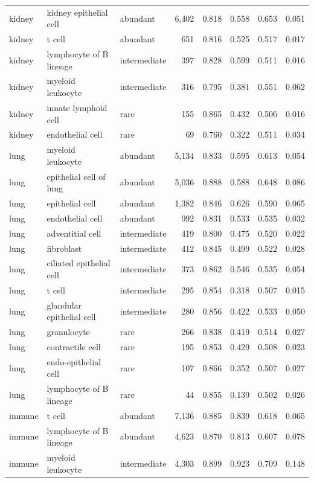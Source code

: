 \documentclass[a4paper,11pt]{article}
\begin{document}
\begin{longtable}{l l l r r r r r}
kidney & kidney epithelial cell & abundant & 6{,}402 & 0.818 & 0.558 & 0.653 & 0.051 \\
kidney & t cell & abundant & 651 & 0.816 & 0.525 & 0.517 & 0.017 \\
kidney & lymphocyte of B lineage & intermediate & 397 & 0.828 & 0.599 & 0.511 & 0.016 \\
kidney & myeloid leukocyte & intermediate & 316 & 0.795 & 0.381 & 0.551 & 0.062 \\
kidney & innate lymphoid cell & rare & 155 & 0.865 & 0.432 & 0.506 & 0.016 \\
kidney & endothelial cell & rare & 69 & 0.760 & 0.322 & 0.511 & 0.034 \\
\addlinespace
lung & myeloid leukocyte & abundant & 5{,}134 & 0.833 & 0.595 & 0.613 & 0.054 \\
lung & epithelial cell of lung & abundant & 5{,}036 & 0.888 & 0.588 & 0.648 & 0.086 \\
lung & epithelial cell & abundant & 1{,}382 & 0.846 & 0.626 & 0.590 & 0.065 \\
lung & endothelial cell & abundant & 992 & 0.831 & 0.533 & 0.535 & 0.032 \\
lung & adventitial cell & intermediate & 419 & 0.800 & 0.475 & 0.520 & 0.022 \\
lung & fibroblast & intermediate & 412 & 0.845 & 0.499 & 0.522 & 0.028 \\
lung & ciliated epithelial cell & intermediate & 373 & 0.862 & 0.546 & 0.535 & 0.054 \\
lung & t cell & intermediate & 295 & 0.854 & 0.318 & 0.507 & 0.015 \\
lung & glandular epithelial cell & intermediate & 280 & 0.856 & 0.422 & 0.533 & 0.050 \\
lung & granulocyte & rare & 266 & 0.838 & 0.419 & 0.514 & 0.027 \\
lung & contractile cell & rare & 195 & 0.853 & 0.429 & 0.508 & 0.023 \\
lung & endo-epithelial cell & rare & 107 & 0.866 & 0.352 & 0.507 & 0.027 \\
lung & lymphocyte of B lineage & rare & 44 & 0.855 & 0.139 & 0.502 & 0.026 \\
\addlinespace
immune & t cell & abundant & 7{,}136 & 0.885 & 0.839 & 0.618 & 0.065 \\
immune & lymphocyte of B lineage & abundant & 4{,}623 & 0.870 & 0.813 & 0.607 & 0.078 \\
immune & myeloid leukocyte & intermediate & 4{,}303 & 0.899 & 0.923 & 0.709 & 0.148 \\

\end{longtable}
\end{document}
